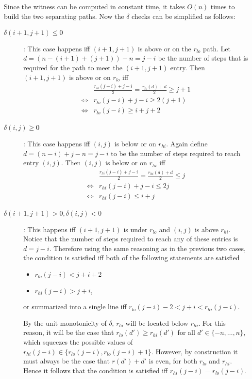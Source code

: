 \documentclass[twoside,11pt,openright]{report}
\begin{document}
Since the witness can be computed in constant time, it takes $O(n)$ times to build the two separating paths. Now the $\delta$ checks can be simplified as follows:
\begin{description}
  \item[$\delta(i + 1, j + 1) \leq 0$]: This case happens iff $(i + 1, j + 1)$ is above or on the $r_{lo}$ path. Let $d = (n - (i + 1) + (j + 1)) - n = j - i$ be the number of steps that is required for the path to meet the $(i + 1, j + 1)$ entry. Then $(i + 1, j + 1)$ is above or on $r_{lo}$ iff
  \begin{align*}
         &\frac{r_{lo}(j - i) + j - i}{2} = \frac{r_{lo}(d) + d}{2} \geq j + 1 \\
    \iff &r_{lo}(j - i) + j - i \geq 2(j + 1) \\
    \iff &r_{lo}(j - i) \geq i + j + 2
  \end{align*}

  \item[$\delta(i, j) \geq 0$]: This case happens iff $(i, j)$ is below or on $r_{hi}$. Again define $d = (n - i) + j - n = j - i$ to be the number of steps required to reach entry $(i, j)$. Then $(i, j)$ is below or on $r_{hi}$ iff
  \begin{align*}
         &\frac{r_{hi}(j - i) + j - i}{2} = \frac{r_{hi}(d) + d}{2} \leq j \\
    \iff &r_{hi}(j - i) + j - i \leq 2j \\
    \iff &r_{hi}(j - i) \leq i + j
  \end{align*}

  \item[$\delta(i + 1, j + 1) > 0, \delta(i, j) < 0$]: This happens iff $(i + 1, j + 1)$ is under $r_{lo}$ and $(i, j)$ is above $r_{hi}$. Notice that the number of steps required to reach any of these entries is $d = j - i$. Therefore using the same reasoning as in the previous two cases, the condition is satisfied iff both of the following statements are satisfied
  \begin{itemize}
  \item $r_{lo}(j - i) < j + i + 2$
  \item $r_{hi}(j - i) > j + i$,
  \end{itemize}
  or summarized into a single line iff $r_{lo}(j - i) - 2 < j + i < r_{hi}(j - i)$.
  
  By the unit monotonicity of $\delta$, $r_{lo}$ will be located below $r_{hi}$. For this reason, it will be the case that $r_{lo}(d') \geq r_{hi}(d')$ for all $d' \in \{-n, \dots, n\}$, which squeezes the possible values of $r_{hi}(j - i) \in \{r_{lo}(j - i), r_{lo}(j - i) + 1\}$. However, by construction it must always be the case that $r(d') + d'$ is even, for both $r_{lo}$ and $r_{hi}$. Hence it follows that the condition is satisfied iff $r_{hi}(j - i) = r_{lo}(j - i)$.
\end{description}%
\end{document}
